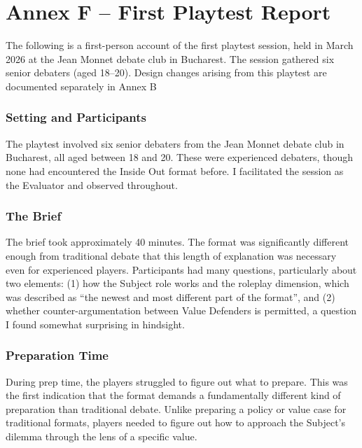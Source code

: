 \section*{Annex F -- First Playtest Report}

The following is a first-person account of the first playtest session, held in March 2026 at the Jean Monnet debate club in Bucharest. The session gathered six senior debaters (aged 18--20). Design changes arising from this playtest are documented separately in Annex B

\subsubsection{Setting and Participants}

The playtest involved six senior debaters from the Jean Monnet debate club in Bucharest, all aged between 18 and 20. These were experienced debaters, though none had encountered the Inside Out format before. I facilitated the session as the Evaluator and observed throughout.

\subsubsection{The Brief}

The brief took approximately 40 minutes. The format was significantly different enough from traditional debate that this length of explanation was necessary even for experienced players. Participants had many questions, particularly about two elements: (1) how the Subject role works and the roleplay dimension, which was described as ``the newest and most different part of the format'', and (2) whether counter-argumentation between Value Defenders is permitted, a question I found somewhat surprising in hindsight.

\subsubsection{Preparation Time}

During prep time, the players struggled to figure out what to prepare. This was the first indication that the format demands a fundamentally different kind of preparation than traditional debate. Unlike preparing a policy or value case for traditional formats, players needed to figure out how to approach the Subject's dilemma through the lens of a specific value.

